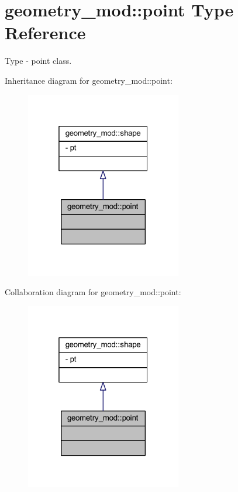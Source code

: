 \hypertarget{structgeometry__mod_1_1point}{}\section{geometry\+\_\+mod\+:\+:point Type Reference}
\label{structgeometry__mod_1_1point}


Type -\/ point class.  




Inheritance diagram for geometry\+\_\+mod\+:\+:point\+:\nopagebreak
\begin{figure}[H]
\begin{center}
\leavevmode
\includegraphics[width=193pt]{structgeometry__mod_1_1point__inherit__graph}
\end{center}
\end{figure}


Collaboration diagram for geometry\+\_\+mod\+:\+:point\+:\nopagebreak
\begin{figure}[H]
\begin{center}
\leavevmode
\includegraphics[width=193pt]{structgeometry__mod_1_1point__coll__graph}
\end{center}
\end{figure}


